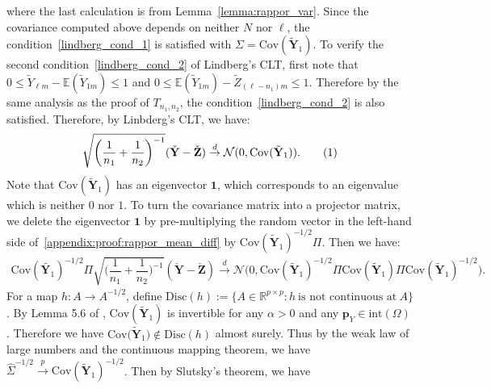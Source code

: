 \documentclass[twoside,11pt]{article}
\newcommand\numberthis{\addtocounter{equation}{1}\tag{\theequation}}
\newcommand{\rvTwo}{Y}
\newcommand{\rvThree}{Z}
\newcommand{\vectorize}[1]{\mathbf{#1}}
\newcommand{\rvY}{Y}
\newcommand{\rVecY}{\vectorize{\rvY}}
\newcommand{\rvZ}{Z}
\newcommand{\rVecZ}{\vectorize{\rvZ}}
\newcommand{\mE}{\mathbb{E}} %
\newcommand{\vectorIndex}{m}
\newcommand{\sampleSize}{n}
\newcommand{\privacyParameter}{\alpha} %
\begin{document}
\begin{appendix}
	where the last calculation is from Lemma~\ref{lemma:rappor_var}.
	Since the covariance computed above depends on neither \( N \) nor \( \ell \), the condition~\eqref{lindberg_cond_1} is satisfied with $\Sigma = \mathrm{Cov}(\tilde{\rVecY}_1)$.
	To verify  the second condition~\eqref{lindberg_cond_2} of Lindberg's CLT, first note that
	$0 \leq \tilde{\rvTwo}_{\ell \vectorIndex}
	-
	\mE(\tilde{\rvTwo}_{1\vectorIndex}) \leq 1$ and
	$0 \leq \mE(\tilde{\rvTwo}_{1\vectorIndex})
	-
	\tilde{\rvThree}_{(\ell-\sampleSize_1)\vectorIndex} \leq 1$.
	Therefore by the same analysis as the proof of $T_{\sampleSize_1, \sampleSize_2}$, the  condition~\eqref{lindberg_cond_2} is also satisfied.
	Therefore, by Linbderg's CLT, we have:
	\begin{align*}
		\sqrt{\biggl( \dfrac{1}{\sampleSize_1}+\dfrac{1}{\sampleSize_2} \biggr)^{-1}}
		(
		\check{\rVecY} 
		-
		\check{\rVecZ} 
		)
		\stackrel{d}{\to}
		\mathcal{N}(0, \mathrm{Cov}(\tilde{\rVecY}_1) ).
		\numberthis \label{appendix:proof:rappor_mean_diff}
	\end{align*}
	Note that $\mathrm{Cov}(\tilde{\rVecY}_1)$ has an eigenvector $\mathbf{1}$, which corresponds to an eigenvalue which is neither $0$ nor $1$.
	To turn the covariance matrix  into a projector matrix, 
	we delete the eigenvector $\mathbf{1}$ by pre-multiplying the random vector in the left-hand side of~\eqref{appendix:proof:rappor_mean_diff} by $\mathrm{Cov}(\tilde{\rVecY}_1)^{-1/2} \Pi$.
	Then we have:
	\begin{align*}
		\mathrm{Cov}(\tilde{\rVecY_1})^{-1/2} \Pi
		\sqrt{\biggl( \dfrac{1}{\sampleSize_1}+\dfrac{1}{\sampleSize_2} \biggr)^{-1}}
		(
		\check{\rVecY} 
		-
		\check{\rVecZ} 
		)
		\stackrel{d}{\to}
		\mathcal{N}
		\bigl(
		0,	\mathrm{Cov}(\tilde{\rVecY}_1)^{-1/2} \Pi \mathrm{Cov}(\tilde{\rVecY}_1) \Pi \mathrm{Cov}(\tilde{\rVecY}_1)^{-1/2}	\bigr).
	\end{align*}
	For a map $h : A \to A^{-1/2}$,  define $\mathrm{Disc}(h) := \{A \in \mathbb{R}^{p \times p}: h~\text{is not continuous at}~A\}$.
	By Lemma 5.6 of \citet{Gaboardi2018LDPChisq}, $\mathrm{Cov}(\tilde{\rVecY}_1)$ is invertible for any $\privacyParameter > 0$ and any $\mathbf{p}_Y \in \mathrm{int}(\Omega)$. Therefore  we have $ \mathrm{Cov}(\tilde{\rVecY}_1 \bigr) \notin \mathrm{Disc}(h)$ almost surely.
	Thus by the weak law of large numbers and the continuous mapping theorem, we have
	$	\hat{\Sigma}^{-1/2} \stackrel{p}{\to} \mathrm{Cov}(\tilde{\rVecY}_1)^{-1/2}$. 
	Then by Slutsky's theorem, 
	we have	\begin{align*}

\end{align*}
\end{appendix}
\end{document}
